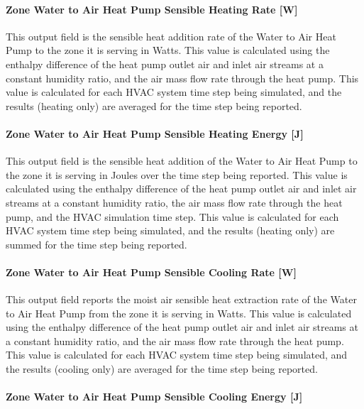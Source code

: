 \paragraph{Zone Water to Air Heat Pump Sensible Heating Rate {[}W{]}}\label{zone-water-to-air-heat-pump-sensible-heating-rate-w}

This output field is the sensible heat addition rate of the Water to Air Heat Pump to the zone it is serving in Watts. This value is calculated using the enthalpy difference of the heat pump outlet air and inlet air streams at a constant humidity ratio, and the air mass flow rate through the heat pump. This value is calculated for each HVAC system time step being simulated, and the results (heating only) are averaged for the time step being reported.

\paragraph{Zone Water to Air Heat Pump Sensible Heating Energy {[}J{]}}\label{zone-water-to-air-heat-pump-sensible-heating-energy-j}

This output field is the sensible heat addition of the Water to Air Heat Pump to the zone it is serving in Joules over the time step being reported. This value is calculated using the enthalpy difference of the heat pump outlet air and inlet air streams at a constant humidity ratio, the air mass flow rate through the heat pump, and the HVAC simulation time step. This value is calculated for each HVAC system time step being simulated, and the results (heating only) are summed for the time step being reported.

\paragraph{Zone Water to Air Heat Pump Sensible Cooling Rate {[}W{]}}\label{zone-water-to-air-heat-pump-sensible-cooling-rate-w}

This output field reports the moist air sensible heat extraction rate of the Water to Air Heat Pump from the zone it is serving in Watts. This value is calculated using the enthalpy difference of the heat pump outlet air and inlet air streams at a constant humidity ratio, and the air mass flow rate through the heat pump. This value is calculated for each HVAC system time step being simulated, and the results (cooling only) are averaged for the time step being reported.

\paragraph{Zone Water to Air Heat Pump Sensible Cooling Energy {[}J{]}}\label{zone-water-to-air-heat-pump-sensible-cooling-energy-j}

